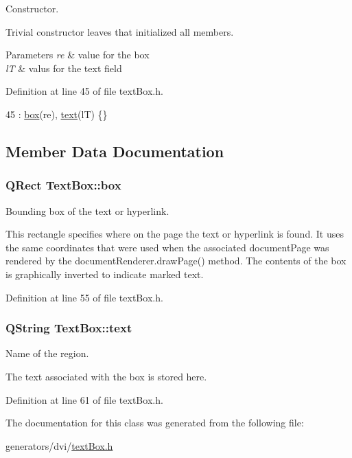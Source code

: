 Constructor. 

Trivial constructor leaves that initialized all members.


\begin{DoxyParams}{Parameters}
{\em re} & value for the box \\
\hline
{\em l\+T} & valus for the text field \\
\hline
\end{DoxyParams}


Definition at line 45 of file text\+Box.\+h.


\begin{DoxyCode}
45 : \hyperlink{classTextBox_aa383110556fc2ca0e787b9618a333074}{box}(re), \hyperlink{classTextBox_a60aeb0b354c3e92da942f3fac174da2e}{text}(lT) \{\}
\end{DoxyCode}


\subsection{Member Data Documentation}
\hypertarget{classTextBox_aa383110556fc2ca0e787b9618a333074}{
\subsubsection[{box}]{\setlength{\rightskip}{0pt plus 5cm}Q\+Rect Text\+Box\+::box}}\label{classTextBox_aa383110556fc2ca0e787b9618a333074}


Bounding box of the text or hyperlink. 

This rectangle specifies where on the page the text or hyperlink is found. It uses the same coordinates that were used when the associated document\+Page was rendered by the document\+Renderer.\+draw\+Page() method. The contents of the box is graphically inverted to indicate marked text. 

Definition at line 55 of file text\+Box.\+h.

\hypertarget{classTextBox_a60aeb0b354c3e92da942f3fac174da2e}{
\subsubsection[{text}]{\setlength{\rightskip}{0pt plus 5cm}Q\+String Text\+Box\+::text}}\label{classTextBox_a60aeb0b354c3e92da942f3fac174da2e}


Name of the region. 

The text associated with the box is stored here. 

Definition at line 61 of file text\+Box.\+h.



The documentation for this class was generated from the following file\+:\begin{DoxyCompactItemize}
\item 
generators/dvi/\hyperlink{textBox_8h}{text\+Box.\+h}\end{DoxyCompactItemize}
